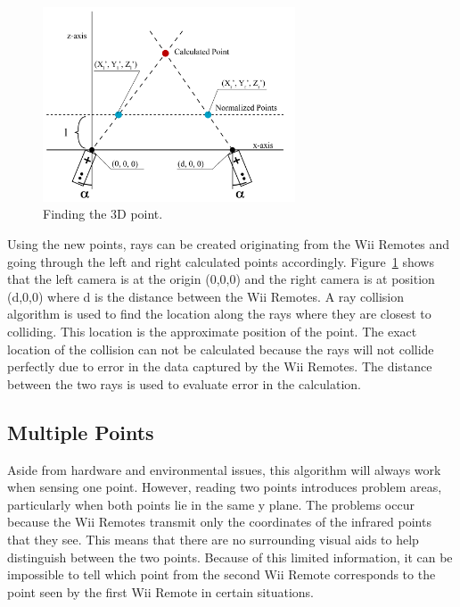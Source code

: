 \documentclass[a4paper,twoside]{article}
\begin{document}
\begin{figure}[h] \includegraphics[width = 7.5cm]{Diagram4_FinalPoint.png}
\caption{Finding the 3D point.} \label{finalpoint} \end{figure}

Using the new points, rays can be created originating from the Wii Remotes and
going through the left and right calculated points accordingly.
Figure~\ref{finalpoint} shows that the left camera is at the origin (0,0,0) and
the right camera is at position (d,0,0) where d is the distance between the Wii
Remotes. A ray collision algorithm is used to find the location along the rays
where they are closest to colliding. This location is the approximate position
of the point. The exact location of the collision can not be calculated because
the rays will not collide perfectly due to error in the data captured by the
Wii Remotes. The distance between the two rays is used to evaluate error in the
calculation.

\subsection{Multiple Points}Aside from hardware and environmental issues, this
algorithm will always work when sensing one point. However, reading two points
introduces problem areas, particularly when both points lie in the same y plane.
The problems occur because the Wii Remotes transmit only the coordinates of the
infrared points that they see. This means that there are no surrounding visual
aids to help distinguish between the two points. Because of this limited
information, it can be impossible to tell which point from the second Wii Remote
corresponds to the point seen by the first Wii Remote in certain situations.  
 
\end{document}
